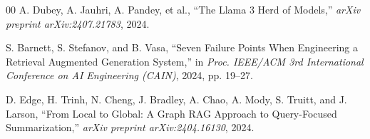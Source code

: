 \documentclass[conference]{IEEEtran}
\begin{document}
\begin{thebibliography}{00}
 A. Dubey, A. Jauhri, A. Pandey, et al., ``The Llama 3 Herd of Models,'' \textit{arXiv preprint arXiv:2407.21783}, 2024.

 S. Barnett, S. Stefanov, and B. Vasa, ``Seven Failure Points When Engineering a Retrieval Augmented Generation System,'' in \textit{Proc. IEEE/ACM 3rd International Conference on AI Engineering (CAIN)}, 2024, pp. 19--27.

 D. Edge, H. Trinh, N. Cheng, J. Bradley, A. Chao, A. Mody, S. Truitt, and J. Larson, ``From Local to Global: A Graph RAG Approach to Query-Focused Summarization,'' \textit{arXiv preprint arXiv:2404.16130}, 2024.
\end{thebibliography}
\endgroup
\end{document}
